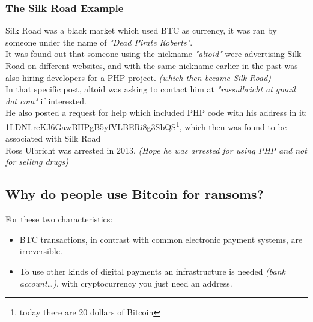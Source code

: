        \subsubsection{The Silk Road Example}
            Silk Road was a black market which used BTC as currency, it was ran by someone under the name of \textit{"Dead Pirate Roberts"}.\\
            It was found out that someone using the nickname \textit{"altoid"} were advertising Silk Road on different websites, and with the same nickname earlier in the past was also hiring developers for a PHP project. \textit{(which then became Silk Road)}\\
            In that specific post, altoid was asking to contact him at \textit{"rossulbricht at gmail dot com"} if interested.\\
            He also posted a request for help which included PHP code with his address in it: 1LDNLreKJ6GawBHPgB5yfVLBERi8g3SbQS\footnote{today there are 20 dollars of Bitcoin}, which then was found to be associated with Silk Road\\
            Ross Ulbricht was arrested in 2013. \textit{(Hope he was arrested for using PHP and not for selling drugs)}
    \subsection{Why do people use Bitcoin for ransoms?}
        For these two characteristics:
        \begin{itemize}
            \item BTC transactions, in contrast with common electronic payment systems, are irreversible.
            \item To use other kinds of digital payments an infrastructure is needed \textit{(bank account\dots)}, with cryptocurrency you just need an address.
        \end{itemize}
